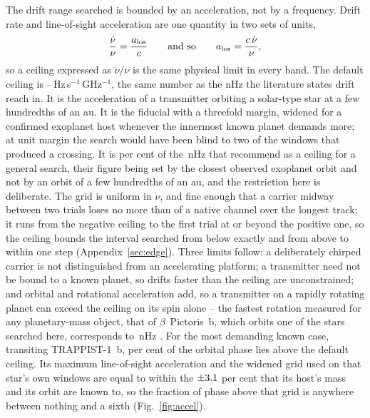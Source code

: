 The drift range searched is bounded by an acceleration, not by a
frequency. Drift rate and line-of-sight acceleration are one quantity in
two sets of units,
%
\begin{equation}
\frac{\dot\nu}{\nu}=\frac{a_{\rm los}}{c}
\qquad\text{and so}\qquad
a_{\rm los}=\frac{c\,\dot\nu}{\nu},
\label{eq:accel}
\end{equation}
%
so a ceiling expressed as $\dot\nu/\nu$ is the same physical limit in
every band. The default ceiling is
\DriftCeilLo--\DriftCeilHi\,Hz\,s$^{-1}$\,GHz$^{-1}$, the same number as
the nHz the literature states drift reach in. It is the acceleration of a
transmitter orbiting a solar-type star at a few hundredths of an au. It is the \citet{Mason2025} fiducial with a
threefold margin, widened for a confirmed exoplanet host whenever the
innermost known planet demands more; at unit margin the search would have
been blind to two of the windows that produced a crossing. It is
\AccelSheikhPct{} per cent of the \AccelSheikhNHz\,nHz that
\citet{Sheikh2019} recommend as a ceiling for a general search, their figure
being set by the closest observed exoplanet orbit and not by an orbit of
a few hundredths of an au, and the restriction here is deliberate. The grid
is uniform in $\dot\nu$, and fine enough that a carrier midway between two
trials loses no more than \DriftGridFineHalf{} of a native channel over the
longest track; it runs from the negative ceiling to the first trial at or
beyond the positive one, so the ceiling bounds the interval searched from
below exactly and from above to within one step
(Appendix~\ref{sec:edge}).
Three
limits follow: a deliberately chirped carrier is not distinguished from an
accelerating platform; a transmitter need not be bound to a known planet,
so drifts faster than the ceiling are unconstrained; and orbital and
rotational acceleration add, so a transmitter on a rapidly rotating planet
can exceed the ceiling on its spin alone -- the fastest rotation measured for
any planetary-mass object, that of $\beta$~Pictoris~b, which orbits one of the
stars searched here, corresponds to \AccelBpicRotNHz\,nHz
\citep{Sheikh2019}. For the most demanding known case,
transiting TRAPPIST-1~b, \TrapPhaseHi{} per cent of the orbital phase lies
above the default ceiling. Its maximum line-of-sight acceleration and the
widened grid used on that star's own windows are equal to within the
$\pm3.1$ per cent that its host's mass and its orbit are known to, so
the fraction of phase above that grid is anywhere between nothing and a sixth
(Fig.~\ref{fig:accel}).

